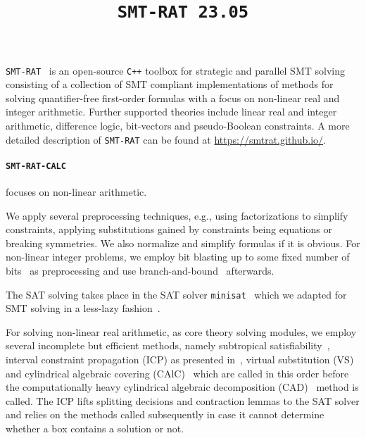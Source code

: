\documentclass{article}
\title{\texttt{SMT-RAT 23.05}}
\begin{document}
\maketitle

\texttt{SMT-RAT}~\cite{Corzilius2015} is an open-source \texttt{C++} toolbox for strategic and parallel SMT solving consisting of a collection of SMT compliant implementations of methods for
solving quantifier-free first-order formulas with a focus on non-linear real and integer arithmetic.
Further supported theories include linear real and integer arithmetic, difference logic, bit-vectors and pseudo-Boolean constraints.
A more detailed description of \texttt{SMT-RAT} can be found at \href{https://smtrat.github.io/}{\color{blue}https://smtrat.github.io/}.


\iffalse
\paragraph{\texttt{SMT-RAT-CALC}} focuses on non-linear arithmetic.

We apply several preprocessing techniques, e.g., using factorizations to simplify constraints, applying substitutions gained by constraints being equations or breaking symmetries. We also normalize and simplify formulas if it is obvious. For non-linear integer problems, we employ bit blasting up to some fixed number of bits~\cite{kruger2015bitvectors} as preprocessing and use branch-and-bound~\cite{Kremer2016} afterwards.

The SAT solving takes place in the SAT solver \texttt{minisat}~\cite{Een2003} which we adapted for SMT solving in a less-lazy fashion~\cite{sebastiani2007lazy}.

For solving non-linear real arithmetic, as core theory solving modules, we employ several incomplete but efficient methods, namely subtropical satisfiability~\cite{Fontaine2017}, interval constraint propagation (ICP) as presented in~\cite{GGIGSC10}, virtual substitution (VS)~\cite{Article_Corzilius_FCT2011} and cylindrical algebraic covering (CAlC)~\cite{Abraham2020} which are called in this order before the computationally heavy cylindrical algebraic decomposition (CAD)~\cite{Loup2013} method is called. The ICP lifts splitting decisions and contraction lemmas to the SAT solver and relies on the methods called subsequently in case it cannot determine whether a box contains a solution or not. 
\end{document}
